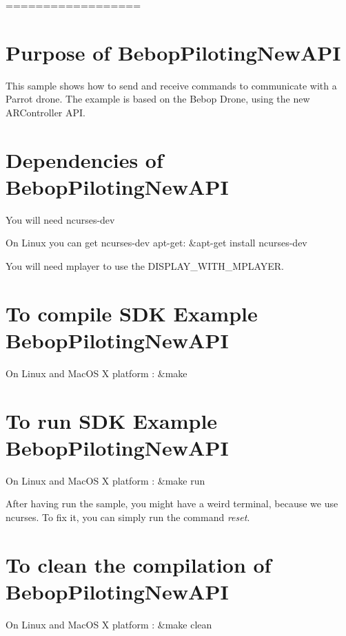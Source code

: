 ================== \section*{Purpose of Bebop\+Piloting\+New\+A\+P\+I }

This sample shows how to send and receive commands to communicate with a Parrot drone. The example is based on the Bebop Drone, using the new A\+R\+Controller A\+P\+I. 

 \section*{Dependencies of Bebop\+Piloting\+New\+A\+P\+I }

You will need ncurses-\/dev

On Linux you can get ncurses-\/dev apt-\/get\+: \&apt-\/get install ncurses-\/dev

You will need mplayer to use the D\+I\+S\+P\+L\+A\+Y\+\_\+\+W\+I\+T\+H\+\_\+\+M\+P\+L\+A\+Y\+E\+R. 

 \section*{To compile S\+D\+K Example Bebop\+Piloting\+New\+A\+P\+I }

On Linux and Mac\+O\+S X platform \+: \&make 

 \section*{To run S\+D\+K Example Bebop\+Piloting\+New\+A\+P\+I }

On Linux and Mac\+O\+S X platform \+: \&make run

After having run the sample, you might have a weird terminal, because we use ncurses. To fix it, you can simply run the command {\itshape reset}. 

 \section*{To clean the compilation of Bebop\+Piloting\+New\+A\+P\+I }

On Linux and Mac\+O\+S X platform \+: \&make clean 